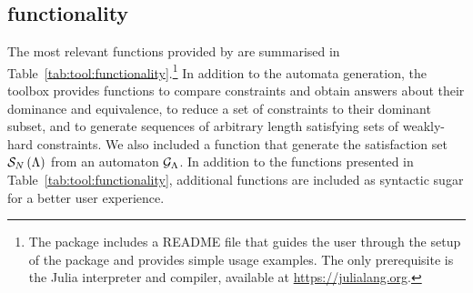 \subsection{\tool{} functionality}%
\label{sec:tool:functionality}%
%

%
The most relevant functions provided by \tool{} are summarised in Table~\ref{tab:tool:functionality}.\footnote{The package includes a README file that guides the user through the setup of the package and provides simple usage examples. The only prerequisite is the Julia interpreter and compiler, available at \url{https://julialang.org}.}
In addition to the automata generation, the toolbox provides functions to compare constraints and obtain answers about their dominance and equivalence, to reduce a set of constraints to their dominant subset, and to generate sequences of arbitrary length satisfying sets of weakly-hard constraints.
We also included a function that generate the satisfaction set $\mathcal{S}_{N}\left( \Lambda \right)$ from an automaton $\mathcal{G}_{\Lambda}$.
In addition to the functions presented in Table~\ref{tab:tool:functionality}, additional functions are included as syntactic sugar for a better user experience.
